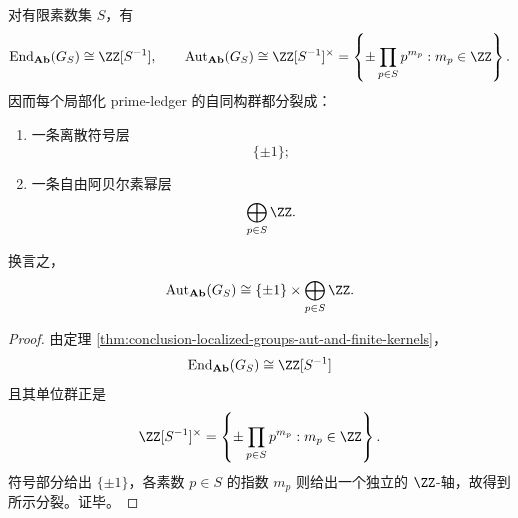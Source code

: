 \begin{theorem}\label{thm:conclusion-phase-cover-localized-automorphism-sign-primepower-splitting}
对有限素数集 \(S\)，有
\[
\operatorname{End}_{\mathbf{Ab}}(G_S)\cong \ZZ[S^{-1}],
\qquad
\operatorname{Aut}_{\mathbf{Ab}}(G_S)\cong \ZZ[S^{-1}]^\times
=
\left\{
\pm\prod_{p\in S}p^{m_p}: m_p\in\ZZ
\right\}.
\]
因而每个局部化 prime-ledger 的自同构群都分裂成：
\begin{enumerate}
  \item 一条离散符号层
  \[
  \{\pm 1\};
  \]
  \item 一条自由阿贝尔素幂层
  \[
  \bigoplus_{p\in S}\ZZ.
  \]
\end{enumerate}
换言之，
\[
\operatorname{Aut}_{\mathbf{Ab}}(G_S)\cong \{\pm1\}\times \bigoplus_{p\in S}\ZZ.
\]
\end{theorem}
\begin{proof}
由定理 \ref{thm:conclusion-localized-groups-aut-and-finite-kernels}，
\[
\operatorname{End}_{\mathbf{Ab}}(G_S)\cong \ZZ[S^{-1}]
\]
且其单位群正是
\[
\ZZ[S^{-1}]^\times
=
\left\{
\pm\prod_{p\in S}p^{m_p}:m_p\in\ZZ
\right\}.
\]
符号部分给出 \(\{\pm1\}\)，各素数 \(p\in S\) 的指数 \(m_p\) 则给出一个独立的 \(\ZZ\)-轴，故得到所示分裂。证毕。
\end{proof}

